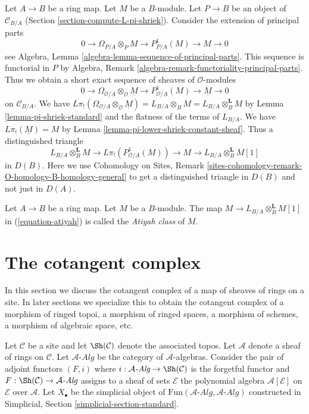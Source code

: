 \noindent
Let $A \to B$ be a ring map. Let $M$ be a $B$-module.
Let $P \to B$ be an object of $\mathcal{C}_{B/A}$
(Section \ref{section-compute-L-pi-shriek}).
Consider the extension of principal parts
$$
0 \to \Omega_{P/A} \otimes_P M \to P^1_{P/A}(M) \to M \to 0
$$
see Algebra, Lemma \ref{algebra-lemma-sequence-of-principal-parts}.
This sequence is functorial in $P$ by
Algebra, Remark \ref{algebra-remark-functoriality-principal-parts}.
Thus we obtain a short exact sequence of sheaves of $\mathcal{O}$-modules
$$
0 \to \Omega_{\mathcal{O}/\underline{A}} \otimes_\mathcal{O} \underline{M} \to
P^1_{\mathcal{O}/\underline{A}}(M) \to \underline{M} \to 0
$$
on $\mathcal{C}_{B/A}$. We have
$L\pi_!(\Omega_{\mathcal{O}/\underline{A}} \otimes_\mathcal{O} \underline{M})
= L_{B/A} \otimes_B M = L_{B/A} \otimes_B^\mathbf{L} M$
by Lemma \ref{lemma-pi-shriek-standard} and the flatness of
the terms of $L_{B/A}$.
We have $L\pi_!(\underline{M}) = M$ by
Lemma \ref{lemma-pi-lower-shriek-constant-sheaf}.
Thus a distinguished triangle
\begin{equation}
\label{equation-atiyah}
L_{B/A} \otimes_B^\mathbf{L} M \to
L\pi_!\left(P^1_{\mathcal{O}/\underline{A}}(M)\right) \to M
\to L_{B/A} \otimes_B^\mathbf{L} M [1]
\end{equation}
in $D(B)$. Here we use Cohomology on Sites, Remark
\ref{sites-cohomology-remark-O-homology-B-homology-general}
to get a distinguished triangle in $D(B)$ and not just in $D(A)$.

\begin{definition}
\label{definition-atiyah-class}
Let $A \to B$ be a ring map. Let $M$ be a $B$-module.
The map $M \to L_{B/A} \otimes_B^\mathbf{L} M[1]$
in (\ref{equation-atiyah}) is called the {\it Atiyah class} of $M$.
\end{definition}




\section{The cotangent complex}
\label{section-cotangent-complex}

\noindent
In this section we discuss the cotangent complex of a map of sheaves
of rings on a site. In later sections we specialize this to obtain
the cotangent complex of a morphism of ringed topoi, a morphism of
ringed spaces, a morphism of schemes, a morphism of algebraic space, etc.

\medskip\noindent
Let $\mathcal{C}$ be a site and let $\Sh(\mathcal{C})$ denote the
associated topos. Let $\mathcal{A}$ denote a sheaf of rings
on $\mathcal{C}$. Let $\mathcal{A}\textit{-Alg}$ be the category of
$\mathcal{A}$-algebras. Consider the pair of adjoint functors $(F, i)$ where
$i : \mathcal{A}\textit{-Alg} \to \Sh(\mathcal{C})$ is the forgetful functor and
$F : \Sh(\mathcal{C}) \to \mathcal{A}\textit{-Alg}$ assigns to a sheaf of sets
$\mathcal{E}$ the polynomial algebra $\mathcal{A}[\mathcal{E}]$ on
$\mathcal{E}$ over $\mathcal{A}$.
Let $X_\bullet$ be the simplicial object of
$\text{Fun}(\mathcal{A}\textit{-Alg}, \mathcal{A}\textit{-Alg})$
constructed in
Simplicial, Section \ref{simplicial-section-standard}.

